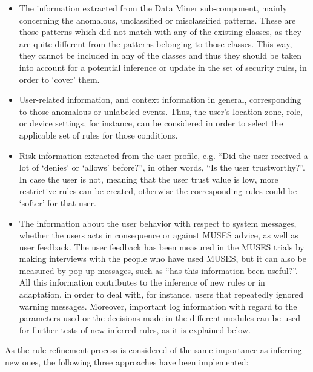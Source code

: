 \begin{itemize}

\item The information extracted from the Data Miner sub-component, mainly concerning the anomalous, unclassified or misclassified patterns. These are those patterns which did not match with any of the existing classes, as they are quite different from the patterns belonging to those classes. This way, they cannot be included in any of the classes and thus they should be taken into account for a potential inference or update in the set of security rules, in order to `cover' them.

\item User-related information, and context information in general, corresponding to those anomalous or unlabeled events. Thus, the user's location zone, role, or device settings, for instance, can be considered in order to select the applicable set of rules for those conditions.

\item Risk information extracted from the user profile, e.g. ``Did the user received a lot of `denies' or `allows' before?'', in other words, ``Is the user trustworthy?''. In case the user is not, meaning that the user trust value is low, more restrictive rules can be created, otherwise the corresponding rules could be `softer' for that user.

\item The information about the user behavior with respect to system messages, whether the users acts in consequence or against MUSES advice, as well as user feedback. The user feedback has been measured in the MUSES trials by making interviews with the people who have used MUSES, but it can also be measured by pop-up messages, such as ``has this information been useful?''.
All this information contributes to the inference of new rules or in adaptation, in order to deal with, for instance, users that repeatedly ignored warning messages.
Moreover, important log information with regard to the parameters used or the decisions made in the different modules can be used for further tests of new inferred rules, as it is explained below.

\end{itemize}

As the rule refinement process is considered of the same importance as inferring new ones, the following three approaches have been implemented:

